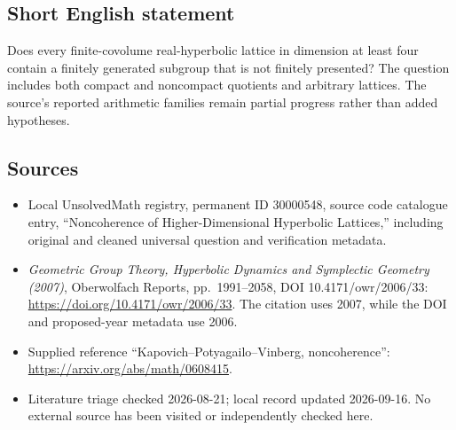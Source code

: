 \documentclass[11pt]{article}
\begin{document}
\subsection{Short English statement}
Does every finite-covolume real-hyperbolic lattice in dimension at least four contain a finitely generated subgroup that is not finitely presented? The question includes both compact and noncompact quotients and arbitrary lattices. The source's reported arithmetic families remain partial progress rather than added hypotheses.
\subsection{Sources}
\begin{itemize}
\item Local UnsolvedMath registry, permanent ID 30000548, source code catalogue entry, ``Noncoherence of Higher-Dimensional Hyperbolic Lattices,'' including original and cleaned universal question and verification metadata.
\item \emph{Geometric Group Theory, Hyperbolic Dynamics and Symplectic Geometry (2007)}, Oberwolfach Reports, pp.\ 1991--2058, DOI 10.4171/owr/2006/33: \url{https://doi.org/10.4171/owr/2006/33}. The citation uses 2007, while the DOI and proposed-year metadata use 2006.
\item Supplied reference ``Kapovich--Potyagailo--Vinberg, noncoherence'': \url{https://arxiv.org/abs/math/0608415}.
\item Literature triage checked 2026-08-21; local record updated 2026-09-16. No external source has been visited or independently checked here.
\end{itemize}
\end{document}
